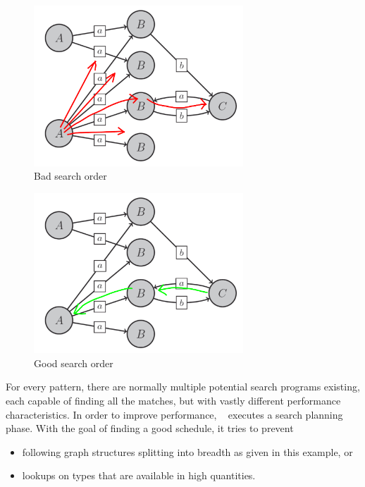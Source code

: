 \vspace{15cm}

\begin{figure}[hptb]
  \centering
  \includegraphics[width=0.7\textwidth]{fig/GraphBad}
  \caption{Bad search order}
  \label{figbadsearch}
\end{figure}

\begin{figure}[hpbt]
  \centering
  \includegraphics[width=0.7\textwidth]{fig/GraphGood}
  \caption{Good search order}
  \label{figgoodsearch}
\end{figure}

For every pattern, there are normally multiple potential search programs existing,
each capable of finding all the matches, but with vastly different performance characteristics.
In order to improve performance, \GrG~ executes a search planning phase.
With the goal of finding a good schedule, it tries to prevent
\begin{itemize}
	\item following graph structures splitting into breadth as given in this example, or
	\item lookups on types that are available in high quantities.
\end{itemize}

